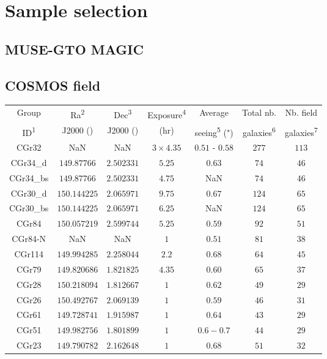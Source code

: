 \clearpage
\section{Sample selection}
\label{sec:Sample_selection}

\subsection{MUSE-GTO MAGIC}

\subsection{COSMOS field}

\begin{table}[htbp]

	\hspace{50pt}

	\begin{tabular}{ccccccc}
	\hline
	Group & Ra\textsuperscript{2} & Dec\textsuperscript{3} & Exposure\textsuperscript{4}  & Average & Total nb. & Nb. field \\
	
	ID\textsuperscript{1} & J2000 (\degree) & J2000 (\degree) & (hr) & seeing\textsuperscript{5} (") & galaxies\textsuperscript{6} & galaxies\textsuperscript{7} \\	
	
	
	\hline
	CGr32 & NaN & NaN & $3 \times 4.35$ & $0.51$ - $0.58$ & $277$ & $113$ \\
	\hline
	CGr34\_d & $149.87766$ & $2.502331$ & $5.25$ & $0.63$ & $74$ & $46$ \\
	\hline
	CGr34\_bs & $149.87766$ & $2.502331$ & $4.75$ & NaN & $74$ & $46$ \\
	\hline
	CGr30\_d & $150.144225$ & $2.065971$ & $9.75$ & $0.67$ & $124$ & $65$ \\
	\hline
	CGr30\_bs & $150.144225$ & $2.065971$ & $6.25$ & NaN & $124$ & $65$ \\
	\hline
	CGr84 & $150.057219$ & $2.599744$ & $5.25$ & $0.59$ & $92$ & $51$ \\
	\hline
	CGr84-N & NaN & NaN & $1$ & $0.51$ & $81$ & $38$ \\
	\hline
	CGr114 & $149.994285$ & $2.258044$ & $2.2$ & $0.68$ & $64$ & $45$ \\
	\hline
	CGr79 & $149.820686$ & $1.821825$ & $4.35$ & $0.60$ & $65$ & $37$ \\
	\hline
	CGr28 & $150.218094$ & $1.812667$ & $1$ & $0.62$ & $49$ & $29$ \\
	\hline
	CGr26 & $150.492767$ & $2.069139$ & $1$ & $0.59$ & $46$ & $31$ \\
	\hline
	CGr61 & $149.728741$ & $1.915987$ & $1$ & $0.64$ & $43$ & $29$ \\
	\hline
	CGr51 & $149.982756$ & $1.801899$ & $1$ & $0.6-0.7$ & $44$ & $29$ \\
	\hline
	CGr23 & $149.790782$ & $2.162648$ & $1$ & $0.68$ & $51$ & $32$ \\
	\hline
	

\end{tabular}
\end{table}
